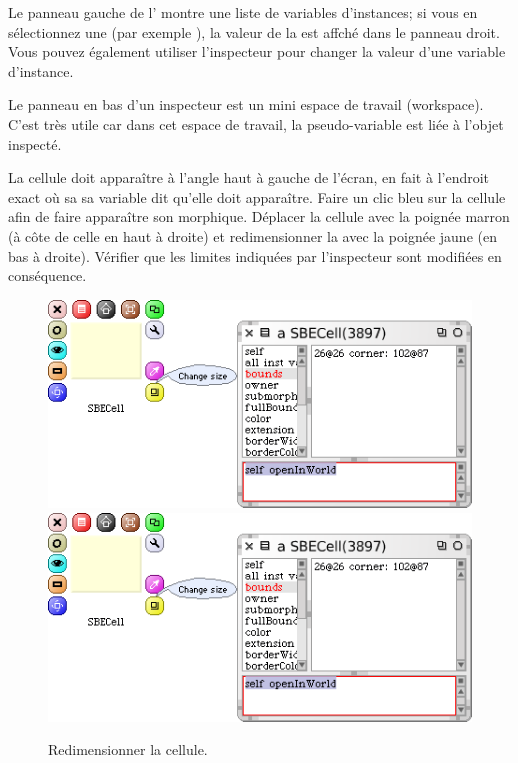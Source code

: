 \documentclass[a4paper,10pt,twoside]{book}
\begin{document}
Le panneau gauche de l' montre une liste de variables d'instances; si vous en sélectionnez une (par exemple \mbox{),} la valeur de la  est affché dans le panneau droit. Vous pouvez également utiliser l'inspecteur pour changer la valeur d'une variable d'instance.


Le panneau en bas d'un inspecteur est un mini espace de travail (workspace). C'est très utile car dans cet espace de travail, la pseudo-variable \self est liée à l'objet inspecté.

La cellule doit apparaître à l'angle haut à gauche de l'écran, en fait à l'endroit exact où sa sa variable  dit qu'elle doit apparaître.
Faire un clic bleu sur la cellule afin de faire apparaître son  morphique.
Déplacer la cellule avec la poignée marron (à côte de celle en haut à droite) et redimensionner la avec la poignée jaune (en bas à droite).
Vérifier que les limites indiquées par l'inspecteur sont modifiées en conséquence.

\begin{figure}[htbp]
\centering
\ifluluelse
	{\includegraphics[width=\textwidth]{SBECellResize} }
	{\includegraphics[scale=0.7]{SBECellResize} }
\caption{Redimensionner la cellule.\label{fig:cellresize}}
\end{figure}
\end{document}
